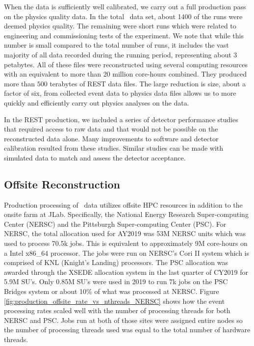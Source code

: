 When the data is sufficiently well calibrated, we carry out a full production pass on the physics quality data. In the total \GX~data set, about 1400 of the runs were deemed physics quality. The remaining were short runs which were related to engineering and commissioning tests of the experiment. We note that while this number is small compared to the total number of runs, it includes the vast majority of all data recorded during the running period, representing about 3 petabytes. All of these files were reconstructed using several computing resources with an equivalent to more than 20 million core-hours combined. They produced more than $500$ terabytes of REST data files. The large reduction is size, about a factor of six, from collected event data to physics data files allows us to  more quickly and efficiently carry out physics analyses on the data.

In the REST production, we included a series of detector performance studies that required access to raw data and that would not be possible on the reconstructed data alone. Many improvements to software and detector calibration resulted from these studies. Similar studies can be made with simulated data to match and assess the detector acceptance.

\subsection{Offsite Reconstruction}
\label{sec:recoffsite}

Production processing of \GX~data utilizes offsite HPC resources in addition to the onsite farm at JLab. Specifically, the National Energy Research Super-computing Center (NERSC) and the Pittsburgh Super-computing Center (PSC). For NERSC, the total allocation used for AY2019 was 53M NERSC units which was used to process 70.5k jobs. This is equivalent to approximately 9M core-hours on a Intel x86\_64 processor. The jobs were run on NERSC's Cori II system which is comprised of KNL (Knight's Landing) processors. The PSC allocation was awarded through the XSEDE allocation system in the last quarter of CY2019 for 5.9M SU's. Only 0.85M SU's were used in 2019 to run 7k jobs on the PSC Bridges system or about 10\% of what was processed at NERSC. Figure \ref{fig:production_offsite_rate_vs_nthreads_NERSC} shows how the event processing rates scaled well with the number of processing threads for both NERSC and PSC. Jobs run at both of those sites were assigned entire nodes so the number of processing threads used was equal to the total number of hardware threads.

